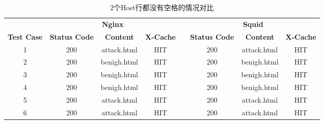 \begin{table}
	\renewcommand\arraystretch{1.1}      %
	\caption{2个Host行都没有空格的情况对比}
	\vspace{1.2mm}                  %
	\centering                            %
	{\tabcolsep  0.05in                    %
		\begin{tabular}{cccccccc}
			\hline
			& \multicolumn{3}{c}{\textbf{Nginx}} & & \multicolumn{3}{c}{\textbf{Squid}}\\
			\cline{2-4}\cline{6-8}
			\textbf{Test Case}& \textbf{Status Code} & \textbf{Content}  & \textbf{X-Cache}  & &  \textbf{Status Code}  & \textbf{Content} & \textbf{X-Cache}\\
			\hline
			1 &   200  &  attack.html  &  HIT  & &  200  &  attack.html  &  HIT \\
			2 &  200 &  benigh.html  &  HIT  & &  200  &  benigh.html  &  HIT \\
			3 &  200  &  benigh.html &  HIT  & &  200  &  benigh.html  &  HIT \\
			4 &  200 &  benigh.html&  HIT      & &  200 & benigh.html   &  HIT \\
		    5 &  200 &  attack.html  &  HIT  & &  200 &  attack.html  &  HIT \\
			6 &  200 &  attack.html  &  HIT     & &  200 & attack.html     &  HIT \\
			\hline
		\end{tabular}
	}
\end{table}

